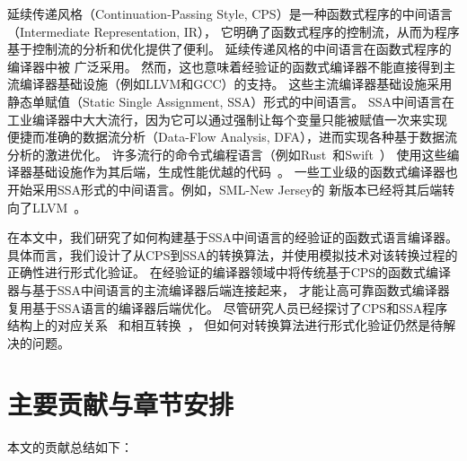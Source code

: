 延续传递风格（Continuation-Passing Style, CPS）是一种函数式程序的中间语言（Intermediate Representation, IR），
它明确了函数式程序的控制流，从而为程序基于控制流的分析和优化提供了便利。
延续传递风格的中间语言在函数式程序的编译器中被
广泛采用\cite{belanger-cpp2013,dargaye2009verification,zoe-oopsla2021,zoe-icfp2021,wang-esop2016}。
然而，这也意味着经验证的函数式编译器不能直接得到主流编译器基础设施（例如LLVM和GCC）的支持。
这些主流编译器基础设施采用静态单赋值（Static Single Assignment, SSA）形式的中间语言。 
SSA中间语言在工业编译器中大大流行，因为它可以通过强制让每个变量只能被赋值一次来实现
便捷而准确的数据流分析（Data-Flow Analysis, DFA），进而实现各种基于数据流分析的激进优化。
许多流行的命令式编程语言（例如Rust~\cite{balasubramanian2017system}和Swift~\cite{zhang2012swift}）
使用这些编译器基础设施作为其后端，生成性能优越的代码~\cite{lattner2006introduction}。
一些工业级的函数式编译器也开始采用SSA形式的中间语言。例如，SML-New Jersey的
新版本已经将其后端转向了LLVM~\cite{farvardin2020new}。

在本文中，我们研究了如何构建基于SSA中间语言的经验证的函数式语言编译器。
具体而言，我们设计了从CPS到SSA的转换算法，并使用模拟技术对该转换过程的正确性进行形式化验证。
在经验证的编译器领域中将传统基于CPS的函数式编译器与基于SSA中间语言的主流编译器后端连接起来，
才能让高可靠函数式编译器复用基于SSA语言的编译器后端优化。
尽管研究人员已经探讨了CPS和SSA程序结构上的对应关系~\cite{appel1998ssa,ssabook}
和相互转换~\cite{farvardin2020new,kelsey1995correspondence}，
但如何对转换算法进行形式化验证仍然是待解决的问题。

\section{主要贡献与章节安排}

本文的贡献总结如下：

